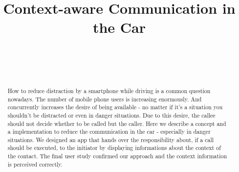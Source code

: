 \documentclass{sigchi}
\def\plaintitle{Context-aware Communication in the Car}
\begin{document}
\title{\plaintitle}

\author{%
  \\
  \\
  \\
}

\maketitle

\begin{abstract}
How to reduce distraction by a smartphone while driving is a common question nowadays. The number of mobile phone users is increasing enormously. And concurrently increases the desire of being available - no matter if it's a situation you shouldn't be distracted or even in danger situations. Due to this desire, the callee should not decide whether to be called but the caller. Here we describe a concept and a implementation to reduce the communication in the car - especially in danger situations. We designed an app that hands over the responsibility about, if a call should be executed, to the initiator by displaying informations about the context of the contact. The final user study confirmed our approach and the context information is perceived correctly.

\end{abstract}
\end{document}
